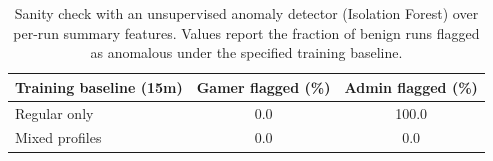 \begin{table}[t]
\centering
\small
\setlength{\tabcolsep}{5pt}
\renewcommand{\arraystretch}{1.12}
\begin{tabular}{lcc}
\toprule
\textbf{Training baseline (15m)} & \textbf{Gamer flagged (\%)} & \textbf{Admin flagged (\%)} \\
\midrule
Regular only & 0.0 & 100.0 \\
Mixed profiles & 0.0 & 0.0 \\
\bottomrule
\end{tabular}
\caption{Sanity check with an unsupervised anomaly detector (Isolation Forest) over per-run summary features. Values report the fraction of benign runs flagged as anomalous under the specified training baseline.}
\label{tab:sanity_iforest}
\end{table}
